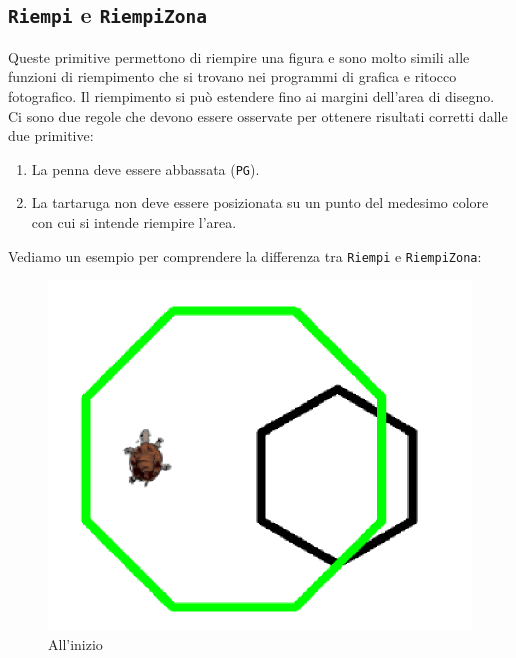 \subsection{\texttt{Riempi} e \texttt{RiempiZona}}
Queste primitive permettono di riempire una figura e sono molto simili alle funzioni di riempimento che si trovano nei programmi di grafica e ritocco fotografico. Il riempimento si può estendere fino ai margini dell'area di disegno. Ci sono due regole che devono essere osservate per ottenere risultati corretti dalle due primitive: 

\begin{enumerate}
	\item La penna deve essere abbassata (\texttt{PG}). 
	\item La tartaruga non deve essere posizionata su un punto del medesimo colore con cui si intende riempire l'area.
\end{enumerate}

\noindent
Vediamo un esempio per comprendere la differenza tra \texttt{Riempi} e \texttt{RiempiZona}:\\
\begin{figure}[h]
	\begin{center}
		\includegraphics*[scale=0.2]{pics/remplis.png}
	\end{center}
	\caption{All'inizio}
\end{figure}
\noindent

